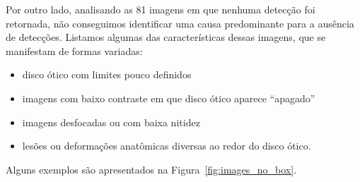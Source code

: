 \documentclass[12pt]{article}
\begin{document}
Por outro lado, analisando as 81 imagens em que nenhuma detecção foi retornada, não conseguimos identificar uma causa predominante para a ausência de detecções. Listamos algumas das características dessas imagens, que se manifestam de formas variadas:
\begin{itemize}[noitemsep,topsep=0pt]
    \item disco ótico com limites pouco definidos
    \item imagens com baixo contraste em que disco ótico aparece ``apagado''
    \item imagens desfocadas ou com baixa nitidez
    \item lesões ou deformações anatômicas diversas ao redor do disco ótico.
\end{itemize}
Alguns exemplos são apresentados na Figura~\ref{fig:images_no_box}.
\end{document}
